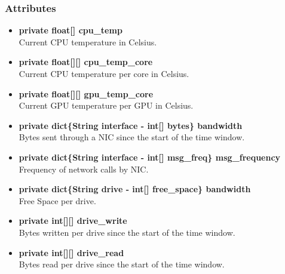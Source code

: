 \subsubsection{Attributes}
\begin{itemize}
	\item \textbf{private float[] cpu\_temp}\\
	Current CPU temperature in Celsius.
	\item \textbf{private float[][] cpu\_temp\_core}\\
	Current CPU temperature per core in Celsius.
	\item \textbf{private float[][] gpu\_temp\_core}\\
	Current GPU temperature per GPU in Celsius.
	\item \textbf{private dict\{String interface - int[] bytes\} bandwidth }\\
	Bytes sent through a NIC since the start of the time window.
	\item \textbf{private dict\{String interface - int[] msg\_freq\} msg\_frequency}\\
	Frequency of network calls by NIC.
	\item \textbf{private dict\{String drive - int[] free\_space\} bandwidth}\\
	Free Space per drive.
	\item \textbf{private int[][] drive\_write}\\
	Bytes written per drive since the start of the time window.
	\item \textbf{private int[][] drive\_read}\\
	Bytes read per drive since the start of the time window.
\end{itemize}

